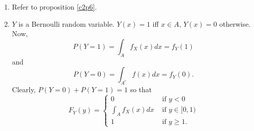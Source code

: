 \documentclass{article}
\begin{document}
\begin{enumerate}
\item Refer to proposition \ref{c2p6}.

\item $Y$ is a Bernoulli random variable. $Y(x) = 1$ iff $x \in A$, $Y(x) = 0$
otherwise. Now,
\[
P(Y = 1) = \int_A f_X(x)dx = f_Y(1)
\]
and
\[
P(Y = 0) = \int_{A^c}f(x) dx = f_Y(0).
\]
Clearly, $P(Y=0) + P(Y=1) = 1$ so that 
\[
F_Y(y) = \begin{cases}
0 & \text{ if } y < 0 \\
\int_A f_X(x)dx & \text{ if } y \in [0, 1) \\
1 & \text{ if } y \ge 1.
\end{cases}
\]
\end{enumerate}
\end{document}

